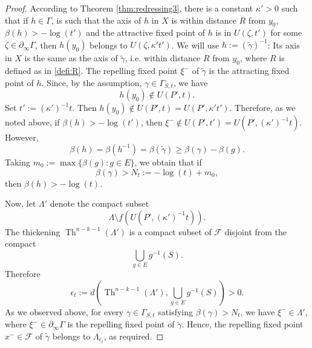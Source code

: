 \documentclass[12pt]{amsbook}%
\theoremstyle{definition}
\theoremstyle{remark}
\numberwithin{section}{chapter}
\numberwithin{subsection}{section}
\numberwithin{figure}{chapter}
\DeclareMathOperator{\Th}{Th}
\def\cF{{\mathscr{F}}}
\def\Ga{\Gamma}
\def\ga{\gamma}
\def\La{\Lambda}
\def\geo{\partial_\infty}
\begin{document}
{{\begin{proof}
According to Theorem \ref{thm:redressing3}, there is %
a constant $\kappa'>0$ such that if $h\in \Ga$, 
is such that the axis of $h$ in $X$ is within distance $R$ from $y_0$, $\beta(h)> -\log(t')$ 
and the attractive fixed point of $h$ %
is in $U(\zeta, t')$ for some $\zeta\in \geo \Gamma$, then $h(y_0)$ 
 belongs to $U(\zeta, \kappa' t')$. We will use $h:= (\tilde\ga)^{-1}$: Its axis in $X$ is the same as the axis of $\tilde\ga$, i.e. within distance 
 $R$ from $y_0$, where $R$ is defined as in \eqref{defi:R}.   The repelling fixed point $\xi^-$ of $\tilde\gamma$ is the attracting fixed point  of 
 $h$. Since, by the assumption, $\gamma \in \Gamma_{S,t}$, we have
 $$
 h(y_0)\notin U(P', t). 
 $$
 Set $t':= (\kappa')^{-1}t$. Then $ h(y_0)\notin U(P',t)= U(P', \kappa' t')$.  Therefore, as we noted above, if $\beta(h)> -\log(t')$, then 
 $\xi^-\notin U(P', t')= U(P', (\kappa')^{-1}t)$. However,
 $$
 \beta(h)=\beta(h^{-1})= \beta(\tilde \ga)\ge \beta(\gamma)-\beta(g) .  
 $$
 Taking $m_0:=\max\{\beta(g): g\in E\}$, we obtain that if 
 $$
 \beta(\gamma)> N_t:= -\log(t)+ m_0,$$  
 then $\beta(h)> -\log(t)$. 
 
 Now, let $\Lambda'$ denote the compact subset 
 $$
 \La \setminus f(U(P', (\kappa')^{-1}t)). 
 $$
 The thickening $\Th^{n-k-1}(\Lambda')$ is a compact subset of $\cF$ disjoint from the compact
 $$
 \bigcup_{g\in E} g^{-1}(S). 
 $$
 Therefore
 $$
 \epsilon_t:= d(\Th^{n-k-1}(\Lambda'), \bigcup_{g\in E} g^{-1}(S))>0. 
 $$
As we observed above, for every $\gamma \in \Gamma_{S,t}$ satisfying $\beta(\gamma)> N_t$, we have $\xi^-\in \La'$, 
where $\xi^-\in \geo\Ga$ is the repelling fixed point of $\tilde\ga$. Hence,  
the repelling fixed point $x^-\in \cF$ of $\tilde{\gamma}$ belongs to $\Lambda_{\epsilon_t}$, as required. 

\end{proof}




}}
\end{document}
